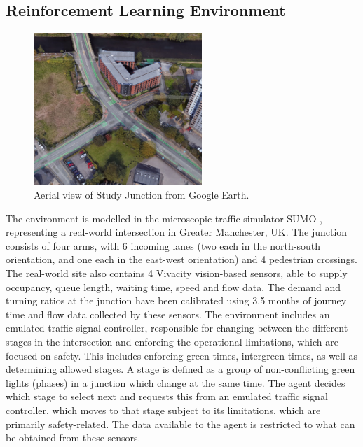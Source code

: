 \documentclass[conference]{IEEEtran}
\begin{document}
\subsection{Reinforcement Learning Environment}
\begin{figure}                                                
\centering                                                    
\includegraphics[width=2.5in]{gmaps_iso_censored.jpg}                                    
\caption{Aerial view of Study Junction from Google Earth.}                                  
\label{intersection}                                               
\end{figure}
The environment is modelled in the microscopic traffic simulator SUMO \cite{sumo}, representing a real-world intersection in Greater Manchester, UK.
The junction consists of four arms, with 6 incoming lanes (two each in the north-south orientation, and one each in the east-west orientation) and 4 pedestrian crossings.
The real-world site also contains 4 Vivacity vision-based sensors, able to supply occupancy, queue length, waiting time, speed and flow data.
The demand and turning ratios at the junction have been calibrated using 3.5 months of journey time and flow data collected by these sensors.
The environment includes an emulated traffic signal controller, responsible for changing between the different stages in the intersection and enforcing the operational limitations, which are focused on safety.
This includes enforcing green times, intergreen times, as well as determining allowed stages.  
A stage is defined as a group of non-conflicting green lights (phases) in a junction which change at the same time.
The agent decides which stage to select next and requests this from an emulated traffic signal controller, which moves to that stage subject to its limitations, which are primarily safety-related.
The data available to the agent is restricted to what can be obtained from these sensors.     
\end{document}
